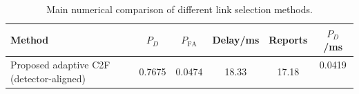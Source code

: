 \begin{table}[t]
    \centering
    \caption{Main numerical comparison of different link selection methods.}
    \label{tab:main_summary}
    \begin{tabular}{l c c c c c}
        \hline
        Method & $P_D$ & $P_{\mathrm{FA}}$ & Delay/ms & Reports & $P_D$/ms \\
        \hline
        Proposed adaptive C2F (detector-aligned) & 0.7675 & 0.0474 & 18.33 & 17.18 & 0.0419 \
        \hline
    \end{tabular}
\end{table}
